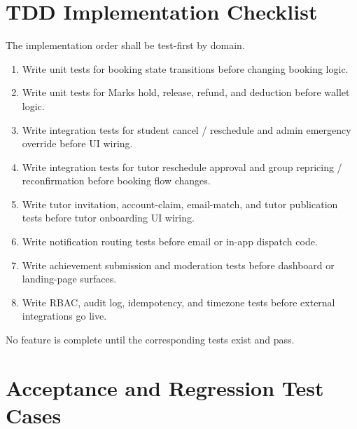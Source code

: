\documentclass[11pt,a4paper]{article}
\begin{document}
\section{TDD Implementation Checklist}

The implementation order shall be test-first by domain.

\begin{enumerate}
	\item Write unit tests for booking state transitions before changing booking logic.
	\item Write unit tests for Marks hold, release, refund, and deduction before wallet logic.
	\item Write integration tests for student cancel / reschedule and admin emergency override before UI wiring.
	\item Write integration tests for tutor reschedule approval and group repricing / reconfirmation before booking flow changes.
	\item Write tutor invitation, account-claim, email-match, and tutor publication tests before tutor onboarding UI wiring.
	\item Write notification routing tests before email or in-app dispatch code.
	\item Write achievement submission and moderation tests before dashboard or landing-page surfaces.
	\item Write RBAC, audit log, idempotency, and timezone tests before external integrations go live.
\end{enumerate}

No feature is complete until the corresponding tests exist and pass.

\section{Acceptance and Regression Test Cases}
\end{document}
